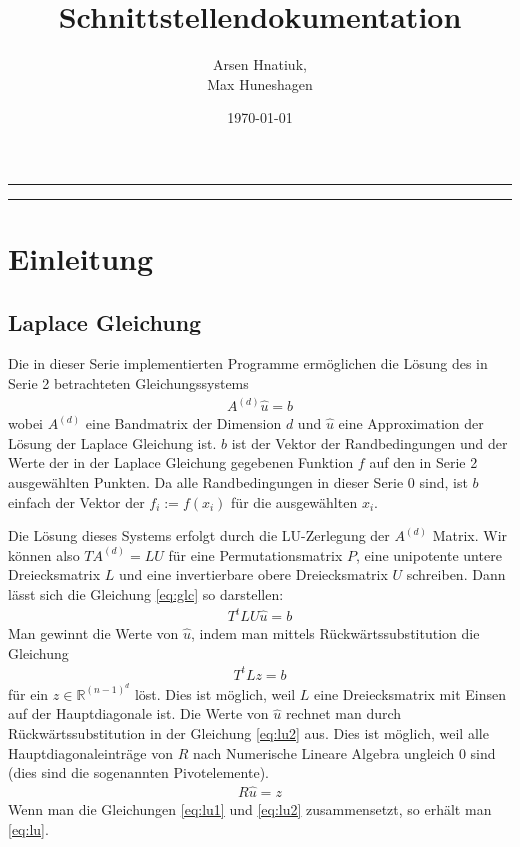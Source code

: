 \documentclass[smallheadings]{scrartcl}
\title{Schnittstellendokumentation}
\author{%
  Arsen Hnatiuk,\\%
  Max Huneshagen 
}
\date{\today}
\numberwithin{equation}{section}
\begin{document}
\maketitle
\tableofcontents
\bigskip

\hrule
\hrule


\section{Einleitung}

\subsection{Laplace Gleichung}
Die in dieser Serie implementierten Programme ermöglichen die Lösung des in Serie 2 betrachteten Gleichungssystems
\begin{align}
A^{(d)}\hat{u} = b
\label{eq:glc}
\end{align}
wobei $A^{(d)}$ eine Bandmatrix der Dimension $d$ und $\hat{u}$ eine Approximation der Lösung der Laplace Gleichung ist. $b$ ist der Vektor der Randbedingungen und der Werte der in der Laplace Gleichung gegebenen Funktion $f$ auf den in Serie 2 ausgewählten Punkten. Da alle Randbedingungen in dieser Serie $0$ sind, ist $b$ einfach der Vektor der $f_i := f(x_i)$ für die ausgewählten $x_i$. 

Die Lösung dieses Systems erfolgt durch die LU-Zerlegung der $A^{(d)}$ Matrix. Wir können also $TA^{(d)}=LU$ für eine Permutationsmatrix $P$, eine unipotente untere Dreiecksmatrix $L$ und eine invertierbare obere Dreiecksmatrix $U$ schreiben. Dann lässt sich die Gleichung \ref{eq:glc} so darstellen:
\begin{align}
T^tLU\hat{u}=b
\label{eq:lu}
\end{align}
Man gewinnt die Werte von $\hat{u}$, indem man mittels Rückwärtssubstitution die Gleichung 
\begin{align}
T^tLz=b
\label{eq:lu1}
\end{align}
für ein $z\in \mathbb{R}^{(n-1)^d}$ löst. Dies ist möglich, weil $L$ eine Dreiecksmatrix mit Einsen auf der Hauptdiagonale ist. Die Werte von $\hat{u}$ rechnet man durch Rückwärtssubstitution in der Gleichung \ref{eq:lu2} aus. Dies ist möglich, weil alle Hauptdiagonaleinträge von $R$ nach Numerische Lineare Algebra ungleich $0$ sind (dies sind die sogenannten Pivotelemente).
\begin{align}
R\hat{u}=z
\label{eq:lu2}
\end{align}
Wenn man die Gleichungen \eqref{eq:lu1} und \eqref{eq:lu2} zusammensetzt, so erhält man \eqref{eq:lu}.
\end{document}
